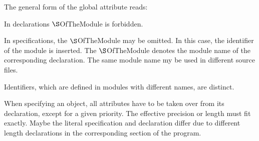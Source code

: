 The general form of the global attribute reads:

\begin{grammarframe}

\end{grammarframe}

In declarations $\S $OfTheModule is forbidden.

In specifications, the $\S $OfTheModule  may be omitted. 
In this case, the identifier of the module is inserted.
The $\S $OfTheModule denotes the module name of the corresponding
declaration.
The same module name my be used in different source files.

Identifiers, which are defined in modules with different names, are distinct.



When specifying an object, all attributes have to be taken over from its
declaration, except for a given priority. 
The effective precision or length 
must fit exactly. Maybe the literal specification and declaration differ 
due to different length declarations
 in the corresponding section of the program.

